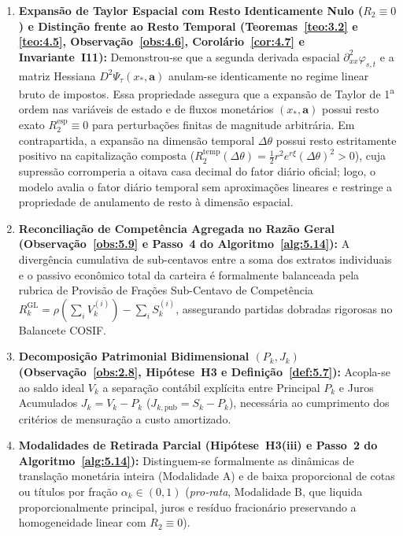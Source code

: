 \documentclass[11pt, a4paper]{article}
\theoremstyle{definition}
\theoremstyle{plain}
\theoremstyle{remark}
\begin{document}
\begin{enumerate}[label=\textbf{\arabic*.}]
    \item \textbf{Expansão de Taylor Espacial com Resto Identicamente Nulo ($R_2 \equiv 0$) e Distinção frente ao Resto Temporal (Teoremas~\ref{teo:3.2} e \ref{teo:4.5}, Observação~\ref{obs:4.6}, Corolário~\ref{cor:4.7} e Invariante~I11):} Demonstrou-se que a segunda derivada espacial $\partial_{xx}^2 \varphi_{s,t}$ e a matriz Hessiana $D^2 \Psi_\tau(x_*, \mathbf{a})$ anulam-se identicamente no regime linear bruto de impostos. Essa propriedade assegura que a expansão de Taylor de 1\textsuperscript{a} ordem nas variáveis de estado e de fluxos monetários $(x_*, \mathbf{a})$ possui resto exato $R_2^{\text{esp}} \equiv 0$ para perturbações finitas de magnitude arbitrária. Em contrapartida, a expansão na dimensão temporal $\Delta\theta$ possui resto estritamente positivo na capitalização composta ($R_2^{\text{temp}}(\Delta\theta) = \frac{1}{2}r^2 e^{r\xi}(\Delta\theta)^2 > 0$), cuja supressão corromperia a oitava casa decimal do fator diário oficial; logo, o modelo avalia o fator diário temporal sem aproximações lineares e restringe a propriedade de anulamento de resto à dimensão espacial.
    \item \textbf{Reconciliação de Competência Agregada no Razão Geral (Observação~\ref{obs:5.9} e Passo~4 do Algoritmo~\ref{alg:5.14}):} A divergência cumulativa de sub-centavos entre a soma dos extratos individuais e o passivo econômico total da carteira é formalmente balanceada pela rubrica de Provisão de Frações Sub-Centavo de Competência $R_k^{\text{GL}} = \rho(\sum_i V_k^{(i)}) - \sum_i S_k^{(i)}$, assegurando partidas dobradas rigorosas no Balancete COSIF.
    \item \textbf{Decomposição Patrimonial Bidimensional $(P_k, J_k)$ (Observação~\ref{obs:2.8}, Hipótese~H3 e Definição~\ref{def:5.7}):} Acopla-se ao saldo ideal $V_k$ a separação contábil explícita entre Principal $P_k$ e Juros Acumulados $J_k = V_k - P_k$ ($J_{k,\text{pub}} = S_k - P_k$), necessária ao cumprimento dos critérios de mensuração a custo amortizado.
    \item \textbf{Modalidades de Retirada Parcial (Hipótese~H3(iii) e Passo~2 do Algoritmo~\ref{alg:5.14}):} Distinguem-se formalmente as dinâmicas de translação monetária inteira (Modalidade A) e de baixa proporcional de cotas ou títulos por fração $\alpha_k \in (0, 1)$ (\emph{pro-rata}, Modalidade B, que liquida proporcionalmente principal, juros e resíduo fracionário preservando a homogeneidade linear com $R_2 \equiv 0$).

\end{enumerate}
\end{document}
